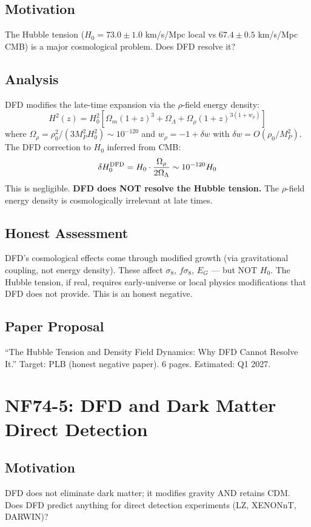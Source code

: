 \documentclass[11pt,a4paper]{article}
\begin{document}
\subsection{Motivation}
The Hubble tension ($H_0 = 73.0 \pm 1.0$ km/s/Mpc local vs $67.4 \pm 0.5$ km/s/Mpc CMB) is a major cosmological problem. Does DFD resolve it?

\subsection{Analysis}
DFD modifies the late-time expansion via the $\rho$-field energy density:
\[
H^2(z) = H_0^2\left[\Omega_m(1+z)^3 + \Omega_\Lambda + \Omega_\rho(1+z)^{3(1+w_\rho)}\right]
\]
where $\Omega_\rho = \rho_0^2/(3M_P^2 H_0^2) \sim 10^{-120}$ and $w_\rho = -1 + \delta w$ with $\delta w = O(\rho_0/M_P^2)$. The DFD correction to $H_0$ inferred from CMB:
\[
\delta H_0^{\rm DFD} = H_0 \cdot \frac{\Omega_\rho}{2\Omega_\Lambda} \sim 10^{-120} H_0
\]
This is negligible. \textbf{DFD does NOT resolve the Hubble tension.} The $\rho$-field energy density is cosmologically irrelevant at late times.

\subsection{Honest Assessment}
DFD's cosmological effects come through modified growth (via gravitational coupling, not energy density). These affect $\sigma_8$, $f\sigma_8$, $E_G$ --- but NOT $H_0$. The Hubble tension, if real, requires early-universe or local physics modifications that DFD does not provide. This is an honest negative.

\subsection{Paper Proposal}
``The Hubble Tension and Density Field Dynamics: Why DFD Cannot Resolve It.'' Target: PLB (honest negative paper). 6 pages. Estimated: Q1 2027.

\section{NF74-5: DFD and Dark Matter Direct Detection}

\subsection{Motivation}
DFD does not eliminate dark matter; it modifies gravity AND retains CDM. Does DFD predict anything for direct detection experiments (LZ, XENONnT, DARWIN)?
\end{document}
